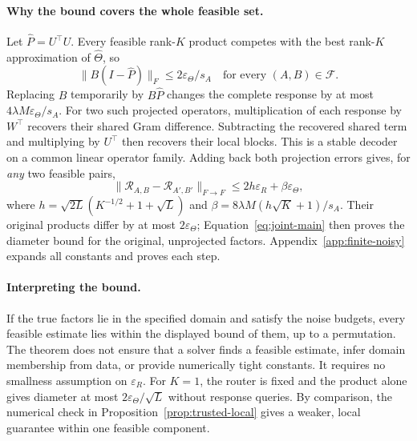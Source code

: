 \paragraph{Why the bound covers the whole feasible set.}
Let $\widehat P=U^\top U$. Every feasible rank-$K$ product competes with
the best rank-$K$ approximation of $\widehat\Theta$, so
\begin{equation}
 \|B(I-\widehat P)\|_F\le 2\varepsilon_\Theta/s_A
 \quad\text{for every }(A,B)\in\mathcal F.
 \label{eq:uniform-subspace-main}
\end{equation}
Replacing $B$ temporarily by $B\widehat P$ changes the complete response
by at most $4\lambda M\varepsilon_\Theta/s_A$. For two such projected
operators, multiplication of each response by $W^\top$ recovers their shared
Gram difference. Subtracting the recovered shared term and multiplying
by $U^\top$ then recovers their local blocks.
This is a stable decoder on a common linear operator family.
Adding back both projection errors gives, for \emph{any} two feasible pairs,
\begin{equation}
 \|\mathcal R_{A,B}-\mathcal R_{A',B'}\|_{F\to F}
 \le 2h\varepsilon_R+\beta\varepsilon_\Theta,
 \label{eq:finite-bridge-main}
\end{equation}
where $h=\sqrt{2L}(K^{-1/2}+1+\sqrt L)$ and
$\beta=8\lambda M(h\sqrt K+1)/s_A$.
Their original products differ by at most $2\varepsilon_\Theta$;
Equation~\ref{eq:joint-main} then proves the diameter bound for the original,
unprojected factors. Appendix~\ref{app:finite-noisy} expands all constants
and proves each step.

\paragraph{Interpreting the bound.}
If the true factors lie in the specified domain and satisfy the noise
budgets, every feasible estimate lies within the displayed bound of them,
up to a permutation.
The theorem does not ensure that a solver finds a feasible estimate, infer
domain membership from data, or provide numerically tight constants.
It requires no smallness assumption on $\varepsilon_R$. For $K=1$, the
router is fixed and the product alone gives diameter at most
$2\varepsilon_\Theta/\sqrt L$ without response queries.
By comparison, the numerical check in
Proposition~\ref{prop:trusted-local} gives a weaker, local guarantee within
one feasible component.
